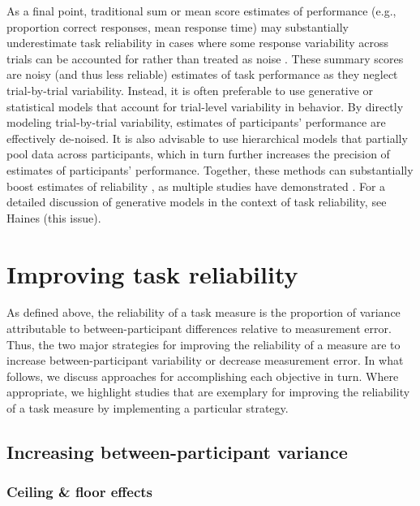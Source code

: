 \documentclass[a4paper,notitlepage,12pt]{article}
\begin{document}
As a final point, traditional sum or mean score estimates of performance (e.g., proportion correct responses, mean response time) may substantially underestimate task reliability in cases where some response variability across trials can be accounted for rather than treated as noise \cite{Rouder2019-am, haines2020learning}. These summary scores are noisy (and thus less reliable) estimates of task performance as they neglect trial-by-trial variability. Instead, it is often preferable to use generative or statistical models that account for trial-level variability in behavior. By directly modeling trial-by-trial variability, estimates of participants' performance are effectively de-noised. It is also advisable to use hierarchical models that partially pool data across participants, which in turn further increases the precision of estimates of participants' performance. Together, these methods can substantially boost estimates of reliability \cite{Rouder2019-am, haines2020learning}, as multiple studies have demonstrated  \cite{snijder2022psychometric, sullivan2022enhancing, brown2020improving, waltmann2022sufficient}. For a detailed discussion of generative models in the context of task reliability, see Haines (this issue).

\section{Improving task reliability}

As defined above, the reliability of a task measure is the proportion of variance attributable to between-participant differences relative to measurement error. Thus, the two major strategies for improving the reliability of a measure are to increase between-participant variability or decrease measurement error. In what follows, we discuss approaches for accomplishing each objective in turn. Where appropriate, we highlight studies that are exemplary for improving the reliability of a task measure by implementing a particular strategy. 

\subsection{Increasing between-participant variance}

\subsubsection{Ceiling \& floor effects}
\end{document}
